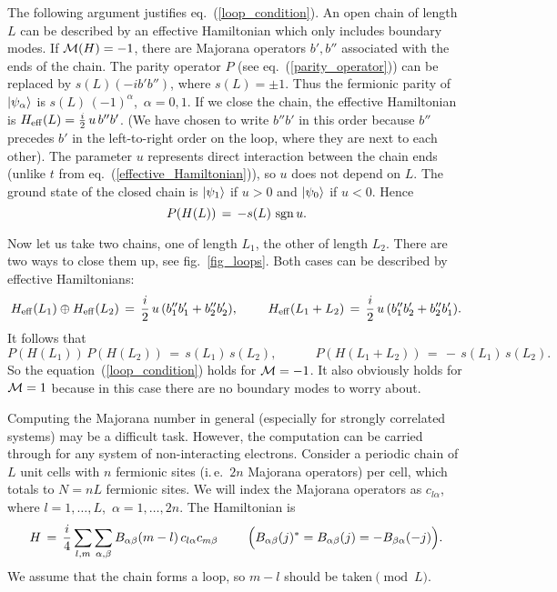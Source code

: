 The following argument justifies eq.~(\ref{loop_condition}). An open chain of
length $L$ can be described by an effective Hamiltonian which only includes
boundary modes. If ${\cal M}(H)=-1$, there are Majorana operators $b',b''$
associated with the ends of the chain. The parity operator $P$ (see
eq.~(\ref{parity_operator})) can be replaced by $s(L)(-ib'b'')$, where
$s(L)=\pm 1$. Thus the fermionic parity of $|\psi_\alpha\rangle$ is
$s(L)\,(-1)^\alpha$,\, $\alpha=0,1$. If we close the chain, the effective
Hamiltonian is $H_{\rm eff}(L)=\frac{i}{2}\,u\,b''b'$. (We have chosen to
write $b''b'$ in this order because $b''$ precedes $b'$ in the left-to-right
order on the loop, where they are next to each other). The parameter $u$
represents direct interaction between the chain ends (unlike $t$ from
eq.~(\ref{effective_Hamiltonian})), so $u$ does not depend on $L$. The ground
state of the closed chain is $|\psi_1\rangle$ if $u>0$ and $|\psi_0\rangle$ if
$u<0$.  Hence
\[
P(H(L))\,=\,-s(L)\,\mathop{\rm sgn}\nolimits u.
\]

Now let us take two chains, one of length $L_1$, the other of length
$L_2$. There are two ways to close them up, see fig.~\ref{fig_loops}.
Both cases can be described by effective Hamiltonians:
\[
H_{\rm eff}(L_1)\oplus H_{\rm eff}(L_2)\,=\,
\frac{i}{2}\,u\,(b_1''b_1'+b_2''b_2'),
\qquad\
H_{\rm eff}(L_1+L_2)\,=\,
\frac{i}{2}\,u\,(b_1''b_2'+b_2''b_1').
\]
It follows that
\[
P(H(L_1))\,P(H(L_2)) \,=\, s(L_1)\,s(L_2), \qquad\quad
P(H(L_1+L_2)) \,=\, -\,s(L_1)\,s(L_2).
\]
So the equation~(\ref{loop_condition}) holds for ${\cal M}=-1$. It also obviously
holds for ${\cal M}=1$ because in this case there are no boundary modes to worry
about.

Computing the Majorana number in general (especially for strongly correlated
systems) may be a difficult task. However, the computation can be carried
through for any system of non-interacting electrons. Consider a periodic chain
of $L$ unit cells with $n$ fermionic sites (i.\,e.\ $2n$ Majorana operators)
per cell, which totals to $N=nL$ fermionic sites. We will index the Majorana
operators as $c_{l\alpha}$, where $l=1,\ldots,L$,\, $\alpha=1,\ldots,2n$. The
Hamiltonian is
\begin{equation}\label{periodic_Hamiltonian}
H \,=\, \frac{i}{4}
\sum_{l,m}\sum_{\alpha,\beta} B_{\alpha\beta}(m-l)\,c_{l\alpha}c_{m\beta}
\qquad\
\Bigl(B_{\alpha\beta}(j)^*=B_{\alpha\beta}(j)=-B_{\beta\alpha}(-j)\Bigr).
\end{equation}
We assume that the chain forms a loop, so $m-l$ should be taken$\pmod{L}$.

